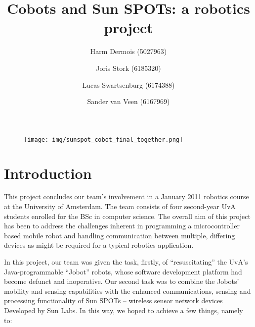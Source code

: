 \documentclass[a4paper,10pt]{article} %
\author{Harm Dermois (5027963) \and Joris Stork (6185320) \and
Lucas Swartsenburg (6174388) \and Sander van Veen (6167969)}
\title{Cobots and Sun SPOTs: a robotics project}
\begin{document}
\maketitle

\thispagestyle{empty}

\abstract{}

\begin{figure}[H]
\label{fig:cobot_sunspot_final}
\centering
\texttt{[image: img/sunspot\_cobot\_final\_together.png]}
\end{figure}


\pagebreak

\tableofcontents

\pagebreak

\section{Introduction} %

This project concludes our team's involvement in a January 2011 robotics course
at the University of Amsterdam. The team consists of four second-year UvA
students enrolled for the BSc in computer science. The overall aim of this
project has been to address the challenges inherent in programming a
microcontroller based mobile robot and handling communication between multiple,
differing devices as might be required for a typical robotics application.

In this project, our team was given the task, firstly, of ``resuscitating'' the
UvA's Java-programmable ``Jobot'' robots, whose software development platform
had become defunct and inoperative. Our second task was to combine the Jobots'
mobility and sensing capabilities with the enhanced communications, sensing and
processing functionality of Sun SPOTs -- wireless sensor network devices
Developed by Sun Labs. In this way, we hoped to achieve a few things, namely to:
\end{document}
